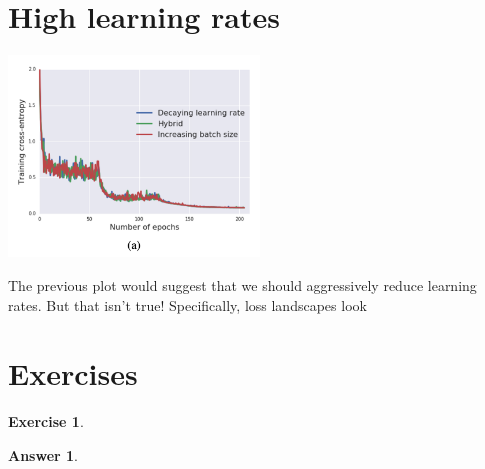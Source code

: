\documentclass{article}
\newtheorem{exercise}{Exercise}
\newtheorem{answer}{Answer}
\newcommand{\0}{\mathbf{0}}
\begin{document}
\newpage
\section{High learning rates}

\begin{center}
  \includegraphics[width=0.5\textwidth]{schedule.png}
\end{center}

The previous plot would suggest that we should aggressively reduce learning rates.
But that isn't true!
Specifically, loss landscapes look


\section{Exercises}

\begin{exercise}
\end{exercise}

\begin{answer}
\end{answer}
\end{document}
